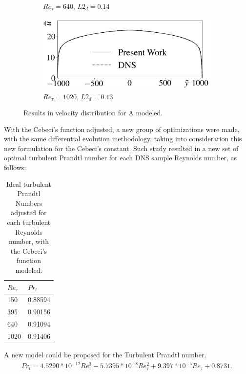 \documentclass[10pt]{article} %
\begin{document}
\begin{figure}[!h]
\begin{subfigure}[t]{0.5\textwidth}
		\caption{$Re_\tau = 640$, $L2_d = 0.14$}
	\end{subfigure}
	\begin{subfigure}[t]{0.45\textwidth}
		\centering
		\includegraphics[angle=0, scale=0.24]{fotos_formatacao_final/Temperature_1000_Amodeled}
		\caption{$Re_\tau = 1020$, $L2_d = 0.13$}
	\end{subfigure}	
	\caption{Results in velocity distribution for A modeled.}
\end{figure}

With the Cebeci's function adjusted, a new group of optimizations were made, with the same differential evolution methodology, taking into consideration this new formulation for the Cebeci's constant. Such study resulted in a new set of optimal turbulent Prandtl number for each DNS sample Reynolds number, as follows:


\begin{table}[!h]
	\centering
	\caption{Ideal turbulent Prandtl Numbers adjusted for each turbulent Reynolds number, with the Cebeci's function modeled. }
	\begin{tabular}{ll}
		\hline
		$Re_\tau$ & $Pr_t$\\
		\hline
		150  &   0.88594\\
		395  &   0.90156\\
		640  &   0.91094\\
		1020 &   0.91406\\ 
		\hline
	\end{tabular}
\end{table}

A new model could be proposed for the Turbulent Prandtl number.
	\vspace{-2mm}
\begin{equation}
\begin{split}
Pr_t = 4.5290 * 10^{-12} Re_\tau^3 - 5.7395 * 10^{-8} Re_\tau^2 + 9.397 * 10^{-5} Re_\tau + 0.8731.
\end{split}
\end{equation}
\end{document}

